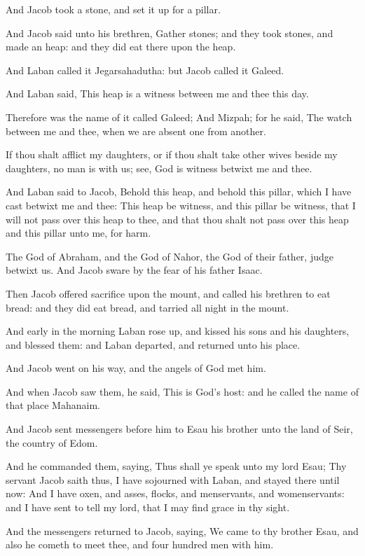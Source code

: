 \Verse And Jacob took a stone, and set it up for a pillar.

\Verse And Jacob said unto his brethren, Gather stones; and they took stones, and made an heap: and they did eat there upon the heap.

\Verse And Laban called it Jegarsahadutha: but Jacob called it Galeed.

\Verse And Laban said, This heap is a witness between me and thee this day.

Therefore was the name of it called Galeed; \Verse And Mizpah; for he said, The \LORD watch between me and thee, when we are absent one from another.

\Verse If thou shalt afflict my daughters, or if thou shalt take other wives beside my daughters, no man is with us; see, God is witness betwixt me and thee.

\Verse And Laban said to Jacob, Behold this heap, and behold this pillar, which I have cast betwixt me and thee: \Verse This heap be witness, and this pillar be witness, that I will not pass over this heap to thee, and that thou shalt not pass over this heap and this pillar unto me, for harm.

\Verse The God of Abraham, and the God of Nahor, the God of their father, judge betwixt us. And Jacob sware by the fear of his father Isaac.

\Verse Then Jacob offered sacrifice upon the mount, and called his brethren to eat bread: and they did eat bread, and tarried all night in the mount.

\Verse And early in the morning Laban rose up, and kissed his sons and his daughters, and blessed them: and Laban departed, and returned unto his place.

\Chapter
\Verse And Jacob went on his way, and the angels of God met him.

\Verse And when Jacob saw them, he said, This is God's host: and he called the name of that place Mahanaim.

\Verse And Jacob sent messengers before him to Esau his brother unto the land of Seir, the country of Edom.

\Verse And he commanded them, saying, Thus shall ye speak unto my lord Esau; Thy servant Jacob saith thus, I have sojourned with Laban, and stayed there until now: \Verse And I have oxen, and asses, flocks, and menservants, and womenservants: and I have sent to tell my lord, that I may find grace in thy sight.

\Verse And the messengers returned to Jacob, saying, We came to thy brother Esau, and also he cometh to meet thee, and four hundred men with him.

